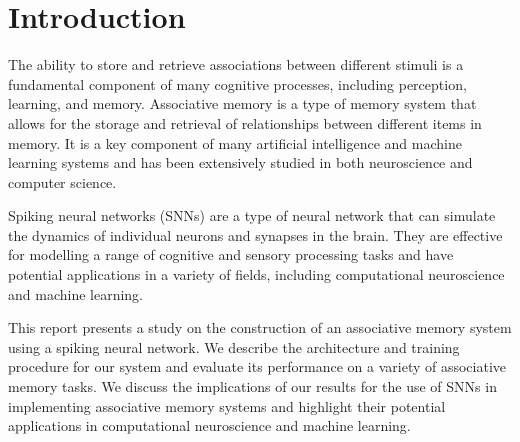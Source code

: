 \chapter{Introduction}%
The ability to store and retrieve associations between different stimuli is a
fundamental component of many cognitive processes, including perception,
learning, and memory. Associative memory is a type of memory system that allows
for the storage and retrieval of relationships between different items in
memory. It is a key component of many artificial intelligence and machine
learning systems and has been extensively studied in both neuroscience and
computer science.

Spiking neural networks (SNNs) are a type of neural network that can simulate
the dynamics of individual neurons and synapses in the brain. They are effective for modelling a range of cognitive and sensory processing
tasks and have potential applications in a variety of fields, including
computational neuroscience and machine learning.

This report presents a study on the construction of an associative memory
system using a spiking neural network. We describe the architecture and
training procedure for our system and evaluate its performance on a variety of
associative memory tasks. We discuss the implications of our results for the
use of SNNs in implementing associative memory systems and highlight their
potential applications in computational neuroscience and machine learning.


\thispagestyle{plain}